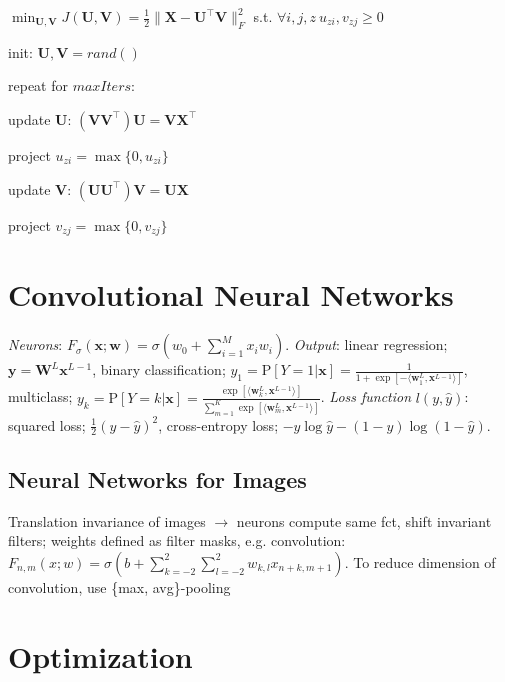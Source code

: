 \documentclass[a4paper, 11pt, landscape]{article}
\begin{document}
\begin{multicols*}{3}
$\min_{\mathbf{U}, \mathbf{V}} J(\mathbf{U}, \mathbf{V}) = \frac{1}{2} \|\mathbf{X} - \mathbf{U}^\top\mathbf{V}\|_F^2$ s.t. $\forall i,j,z~u_{zi},v_{zj} \geq 0 $

\begin{inparaenum}
	\item init: $\mathbf{U}, \mathbf{V} = rand()$
	\item repeat for $\mathit{maxIters}$:
	\item update $\mathbf{U}$: $(\mathbf{VV}^\top)\mathbf{U} = \mathbf{VX}^\top$
	\item project $u_{zi} = \max \{ 0, u_{zi} \}$
	\item update $\mathbf{V}$: $(\mathbf{UU}^\top)\mathbf{V} = \mathbf{UX}$
	\item project $v_{zj} = \max \{ 0, v_{zj} \}$
\end{inparaenum}

\section{Convolutional Neural Networks}
\emph{Neurons}: $F_\sigma(\mathbf{x};\mathbf{w}) = \sigma(w_0 + \sum_{i=1}^M{x_iw_i})$. \emph{Output}: linear regression; $\mathbf{y} = \mathbf{W}^L\mathbf{x}^{L-1}$, binary classification; $y_1 = \text{P}[Y=1|\mathbf{x}] = \frac{1}{1 + \exp[-\langle \mathbf{w}_1^L,\mathbf{x}^{L-1}\rangle]}$, multiclass; $y_k = \text{P}[Y=k|\mathbf{x}]= \frac{\exp[\langle \mathbf{w}_k^L,\mathbf{x}^{L-1}\rangle]}{\sum_{m=1}^{K}{\exp[\langle \mathbf{w}_m^L, \mathbf{x}^{L-1}\rangle]}}$. \emph{Loss function} $l(y, \hat{y})$: squared loss; $\frac{1}{2}(y - \hat{y})^2$, cross-entropy loss; $-y \log \hat{y} - (1-y)\log(1-\hat{y})$.

\subsection{Neural Networks for Images}
Translation invariance of images $\rightarrow$ neurons compute same fct, shift invariant filters; weights defined as filter masks, e.g. convolution: $F_{n,m}(x;w) = \sigma(b + \sum_{k=-2}^2\sum_{l=-2}^{2}{w_{k,l}x_{n+k,m+1}})$. To reduce dimension of convolution, use \{max, avg\}-pooling 

\section{Optimization}


\end{multicols*}
\end{document}
